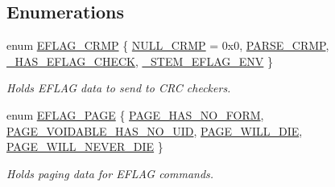 \subsection*{Enumerations}
\begin{DoxyCompactItemize}
\item 
enum \hyperlink{namespacecrunchy_acc00ed7986064df9b2232c76a22709c4}{E\+F\+L\+A\+G\+\_\+\+C\+R\+M\+P} \{ \hyperlink{namespacecrunchy_acc00ed7986064df9b2232c76a22709c4a8cc66679b59c48ccb2d9b35f3761979d}{N\+U\+L\+L\+\_\+\+C\+R\+M\+P} = 0x0, 
\hyperlink{namespacecrunchy_acc00ed7986064df9b2232c76a22709c4a4fcc2f729bd2b01f871e8f0cea43127c}{P\+A\+R\+S\+E\+\_\+\+C\+R\+M\+P}, 
\hyperlink{namespacecrunchy_acc00ed7986064df9b2232c76a22709c4a1551775cd317af7882c75d96d25ab819}{\+\_\+\+H\+A\+S\+\_\+\+E\+F\+L\+A\+G\+\_\+\+C\+H\+E\+C\+K}, 
\hyperlink{namespacecrunchy_acc00ed7986064df9b2232c76a22709c4ab85d7a8c84ed693d462fd413330c33c5}{\+\_\+\+S\+T\+E\+M\+\_\+\+E\+F\+L\+A\+G\+\_\+\+E\+N\+V}
 \}\begin{DoxyCompactList}\small\item\em Holds E\+F\+L\+A\+G data to send to C\+R\+C checkers. \end{DoxyCompactList}
\item 
enum \hyperlink{namespacecrunchy_ad63d9cf0dc471a6e9379c12cd89fb5a9}{E\+F\+L\+A\+G\+\_\+\+P\+A\+G\+E} \{ \hyperlink{namespacecrunchy_ad63d9cf0dc471a6e9379c12cd89fb5a9a48d2d3c0ba354f76e55077d68980cfba}{P\+A\+G\+E\+\_\+\+H\+A\+S\+\_\+\+N\+O\+\_\+\+F\+O\+R\+M}, 
\hyperlink{namespacecrunchy_ad63d9cf0dc471a6e9379c12cd89fb5a9a155358a15b014d55f44420c2873a1462}{P\+A\+G\+E\+\_\+\+V\+O\+I\+D\+A\+B\+L\+E\+\_\+\+H\+A\+S\+\_\+\+N\+O\+\_\+\+U\+I\+D}, 
\hyperlink{namespacecrunchy_ad63d9cf0dc471a6e9379c12cd89fb5a9afc2fedd6cffdfcc42f3688718a868694}{P\+A\+G\+E\+\_\+\+W\+I\+L\+L\+\_\+\+D\+I\+E}, 
\hyperlink{namespacecrunchy_ad63d9cf0dc471a6e9379c12cd89fb5a9a7e1cf7b87501f14c7b257dcd9547c9f1}{P\+A\+G\+E\+\_\+\+W\+I\+L\+L\+\_\+\+N\+E\+V\+E\+R\+\_\+\+D\+I\+E}
 \}\begin{DoxyCompactList}\small\item\em Holds paging data for E\+F\+L\+A\+G commands. \end{DoxyCompactList}
\end{DoxyCompactItemize}
